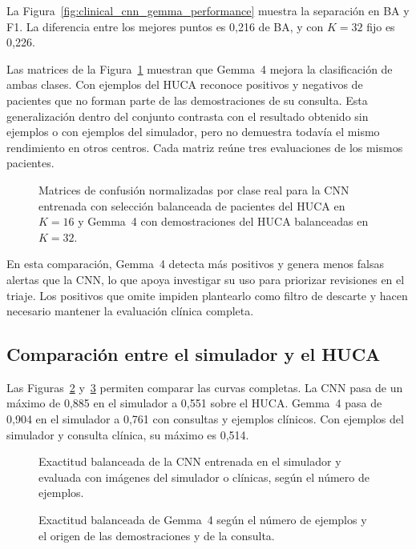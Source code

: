 La Figura~\ref{fig:clinical_cnn_gemma_performance} muestra la separación en BA y F1. La diferencia entre los mejores puntos es 0,216 de BA, y con \(K=32\) fijo es 0,226.

Las matrices de la Figura~\ref{fig:clinical_cnn_gemma_confusions} muestran que Gemma~4 mejora la clasificación de ambas clases. Con ejemplos del HUCA reconoce positivos y negativos de pacientes que no forman parte de las demostraciones de su consulta. Esta generalización dentro del conjunto contrasta con el resultado obtenido sin ejemplos o con ejemplos del simulador, pero no demuestra todavía el mismo rendimiento en otros centros. Cada matriz reúne tres evaluaciones de los mismos pacientes.

\begin{figure}[H]
  \centering
  \caption{Matrices de confusión normalizadas por clase real para la CNN entrenada con selección balanceada de pacientes del HUCA en \(K=16\) y Gemma~4 con demostraciones del HUCA balanceadas en \(K=32\).}
  \label{fig:clinical_cnn_gemma_confusions}
\end{figure}

En esta comparación, Gemma~4 detecta más positivos y genera menos falsas alertas que la CNN, lo que apoya investigar su uso para priorizar revisiones en el triaje. Los positivos que omite impiden plantearlo como filtro de descarte y hacen necesario mantener la evaluación clínica completa.

\subsection{Comparación entre el simulador y el HUCA}

Las Figuras~\ref{fig:domain_gap_cnn} y~\ref{fig:domain_gap_icl} permiten comparar las curvas completas. La CNN pasa de un máximo de 0,885 en el simulador a 0,551 sobre el HUCA. Gemma~4 pasa de 0,904 en el simulador a 0,761 con consultas y ejemplos clínicos. Con ejemplos del simulador y consulta clínica, su máximo es 0,514.

\begin{figure}[H]
  \centering
  \caption{Exactitud balanceada de la CNN entrenada en el simulador y evaluada con imágenes del simulador o clínicas, según el número de ejemplos.}
  \label{fig:domain_gap_cnn}
\end{figure}

\begin{figure}[H]
  \centering
  \caption{Exactitud balanceada de Gemma~4 según el número de ejemplos y el origen de las demostraciones y de la consulta.}
  \label{fig:domain_gap_icl}
\end{figure}
